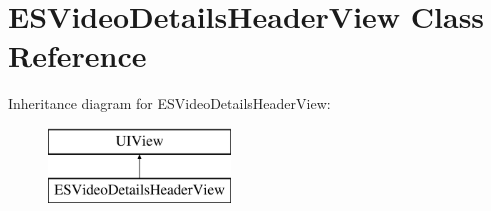 \hypertarget{interface_e_s_video_details_header_view}{}\section{E\+S\+Video\+Details\+Header\+View Class Reference}
\label{interface_e_s_video_details_header_view}
Inheritance diagram for E\+S\+Video\+Details\+Header\+View\+:\begin{figure}[H]
\begin{center}
\leavevmode
\includegraphics[height=2.000000cm]{interface_e_s_video_details_header_view}
\end{center}
\end{figure}
